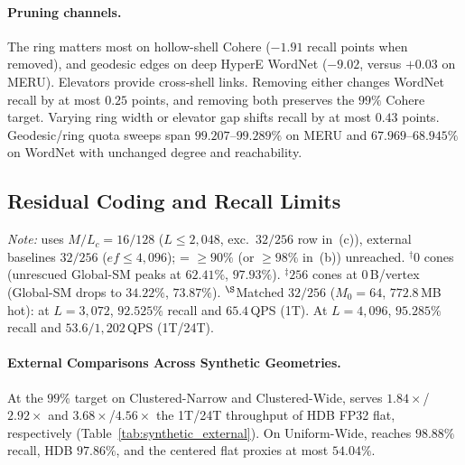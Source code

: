 \paragraph{Pruning channels.}
The ring matters most on hollow-shell Cohere ($-1.91$ recall points when removed), and geodesic edges on deep HyperE WordNet ($-9.02$, versus $+0.03$ on MERU). Elevators provide cross-shell links. Removing either changes WordNet recall by at most $0.25$ points, and removing both preserves the $99\%$ Cohere target. Varying ring width or elevator gap shifts recall by at most $0.43$ points. Geodesic/ring quota sweeps span $99.207$--$99.289\%$ on MERU and $67.969$--$68.945\%$ on WordNet with unchanged degree and reachability.

\subsection{Residual Coding and Recall Limits}
\label{subsec:eval_synthetic}

\begin{table}[t]
  \centering
  \caption{Synthetic hyperbolic comparison (1M vectors, 512D, Zen~4, 32 build threads, $2{,}000$ queries): clustered high-recall~(a), wide isotropic~(b), narrow-shell limits~(c), and centered flat-proxy peak collapse~(d).}
  \label{tab:synthetic_external}
  \scriptsize
  \setlength{\tabcolsep}{1.5pt}
  
  \par\vspace{1pt}
  {\scriptsize \textit{Note:} \rquiver{} uses $M/L_c=16/128$ ($L \le 2{,}048$, exc.\ $32/256$ row in~(c)), external baselines $32/256$ ($ef \le 4{,}096$); \missing{} = $\ge 90\%$ (or $\ge 98\%$ in~(b)) unreached. $^\dagger$$0$ cones (unrescued {Global-SM} peaks at $62.41\%$, $97.93\%$). $^\ddagger$$256$ cones at $0$\,B/vertex ({Global-SM} drops to $34.22\%$, $73.87\%$). $^\S$Matched $32/256$ ($M_0=64$, $772.8$\,MB hot): at $L=3{,}072$, $92.525\%$ recall and $65.4$\,QPS (1T). At $L=4{,}096$, $95.285\%$ recall and $53.6/1{,}202$\,QPS (1T/24T).}
\end{table}

\paragraph{External Comparisons Across Synthetic Geometries.}
At the $99\%$ target on Clustered-Narrow and Clustered-Wide, \rquiver{} serves $1.84\times$/$2.92\times$ and $3.68\times$/$4.56\times$ the 1T/24T throughput of HDB FP32 flat, respectively (Table~\ref{tab:synthetic_external}). On Uniform-Wide, \rquiver{} reaches $98.88\%$ recall, HDB $97.86\%$, and the centered flat proxies at most $54.04\%$.

